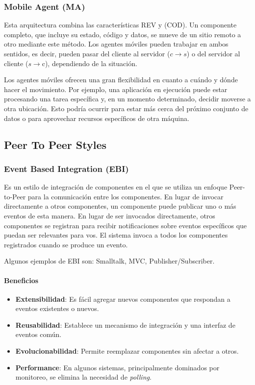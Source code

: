 \documentclass{article}
\begin{document}
		\subsubsection{Mobile Agent (MA)}
		Esta arquitectura combina las características REV y (COD). Un componente completo, que incluye su estado, código y datos, se mueve de un sitio remoto a otro mediante este método. Los agentes móviles pueden trabajar en ambos sentidos, es decir, pueden pasar del cliente al servidor ($c \to s$) o del servidor al cliente ($s \to  $c), dependiendo de la situación.
		
		Los agentes móviles ofrecen una gran flexibilidad en cuanto a cuándo y dónde hacer el movimiento. Por ejemplo, una aplicación en ejecución puede estar procesando una tarea específica y, en un momento determinado, decidir moverse a otra ubicación. Esto podría ocurrir para estar más cerca del próximo conjunto de datos o para aprovechar recursos específicos de otra máquina.
		
		\subsection{Peer To Peer Styles}
			\subsubsection{Event Based Integration (EBI)}
			Es un estilo de integración de componentes en el que se utiliza un enfoque Peer-to-Peer para la comunicación entre los componentes. En lugar de invocar directamente a otros componentes, un componente puede publicar uno o más eventos de esta manera. En lugar de ser invocados directamente, otros componentes se registran para recibir notificaciones sobre eventos específicos que puedan ser relevantes para vos. El sistema invoca a todos los componentes registrados cuando se produce un evento.
			
			
			Algunos ejemplos de EBI son: Smalltalk, MVC, Publisher/Subscriber.
			
			\paragraph{Beneficios}
				\begin{itemize}	
					\item {\textbf{Extensibilidad}}: Es fácil agregar nuevos componentes que respondan a
					eventos existentes o nuevos.
					
					\item {\textbf{Reusabilidad}}: Establece un mecanismo de integración y una interfaz
					de eventos común.
					
					\item {\textbf{Evolucionabilidad}}: Permite reemplazar componentes sin afectar a otros.
					
					\item {\textbf{Performance}}: En algunos sistemas, principalmente dominados por
					monitoreo, se elimina la necesidad de \textit{polling}.
					
				\end{itemize}
			
\end{document}
